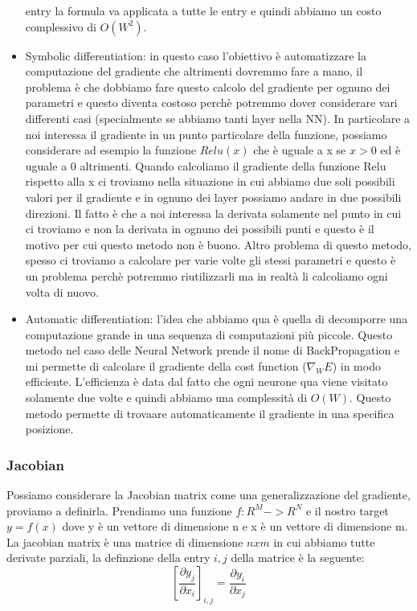\documentclass[14pt]{extreport}
\begin{document}
\begin{itemize}
entry la formula va applicata a tutte le entry e quindi abbiamo un costo complessivo di $O(W^2)$.
\item Symbolic differentiation: in questo caso l'obiettivo è automatizzare la computazione del gradiente che altrimenti dovremmo fare a mano, il
problema è che dobbiamo fare questo calcolo del gradiente per ognuno dei parametri e questo diventa costoso perchè potremmo dover considerare vari
differenti casi (specialmente se abbiamo tanti layer nella NN). In particolare a noi interessa il gradiente in un punto particolare della funzione,
possiamo considerare ad esempio la funzione $Relu(x)$ che è uguale a x se $x>0$ ed è uguale a 0 altrimenti. Quando calcoliamo il gradiente della
funzione Relu rispetto alla x ci troviamo nella situazione in cui abbiamo due soli possibili valori per il gradiente e in ognuno dei layer possiamo
andare in due possibili direzioni. Il fatto è che a noi interessa la derivata solamente nel punto in cui ci troviamo e non la derivata in ognuno dei
possibili punti e questo è il motivo per cui questo metodo non è buono. Altro problema di questo metodo, spesso ci troviamo a calcolare per varie
volte gli stessi parametri e questo è un problema perchè potremmo riutilizzarli ma in realtà li calcoliamo ogni volta di nuovo.
\item Automatic differentiation: l'idea che abbiamo qua è quella di decomporre una computazione grande in una sequenza di computazioni più piccole.
Questo metodo nel caso delle Neural Network prende il nome di BackPropagation e mi permette di calcolare il gradiente della cost function ($\nabla_W
E$) in modo efficiente. L'efficienza è data dal fatto che ogni neurone qua viene visitato solamente due volte e quindi abbiamo una complessità di
$O(W)$. Questo metodo permette di trovaare automaticamente il gradiente in una specifica posizione.
\end{itemize}

\subsubsection{Jacobian}

Possiamo considerare la Jacobian matrix come una generalizzazione del gradiente, proviamo a definirla. Prendiamo una funzione $f: R^M -> R^N$ e il
nostro target $y = f(x)$ dove y è un vettore di dimensione n e x è un vettore di dimensione m. La jacobian matrix è una matrice di dimensione $nxm$ in
cui abbiamo tutte derivate parziali, la definzione della entry $i,j$ della matrice è la seguente:
$$[\frac{\partial y_j}{\partial x_i}]_{i,j} = \frac{\partial y_i}{\partial x_j}$$
\end{document}
